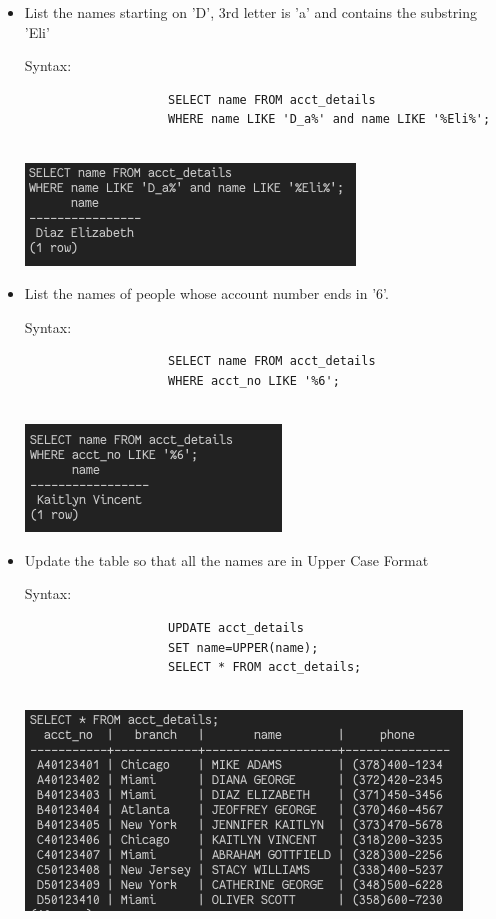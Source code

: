 \documentclass[13pt,oneside]{book}
\begin{document}
\begin{itemize}
					
					\item
					List the names starting on 'D’, 3rd letter is 'a’ and contains the substring 'Eli’
					 
					Syntax:
					\begin{verbatim}
					SELECT name FROM acct_details
					WHERE name LIKE 'D_a%' and name LIKE '%Eli%';
					
					\end{verbatim}
					\includegraphics[]{img/p6/ss5.png}
					
					
					\item
					List the names of people whose account number ends in '6’.
					 
					Syntax:
					\begin{verbatim}
					SELECT name FROM acct_details
					WHERE acct_no LIKE '%6';
					
					\end{verbatim}
					\includegraphics[]{img/p6/ss6.png}
					
					
					\item
					Update the table so that all the names are in Upper Case Format
					 
					Syntax:
					\begin{verbatim}
					UPDATE acct_details
					SET name=UPPER(name);
					SELECT * FROM acct_details;
					
					\end{verbatim}
					\includegraphics[]{img/p6/ss7.png}
					

\end{itemize}
\end{document}
